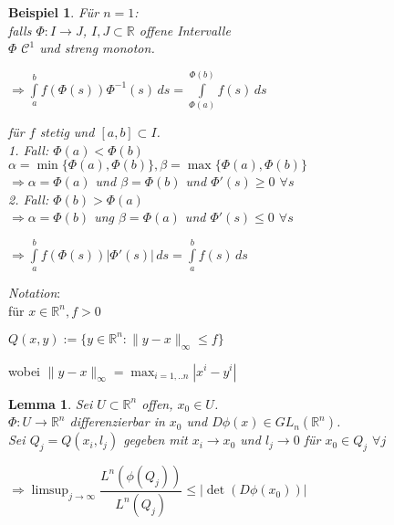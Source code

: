 \documentclass[11pt]{memoir}
\theoremstyle{changebreak}
\newtheorem{Beispiel}{Beispiel}[chapter]
\newtheorem{Lemma}{Lemma}[chapter]
\begin{document}
\begin{Beispiel}
Für $n = 1$: \\
falls $\Phi: I \rightarrow J$, $I, J \subset \mathbb R$ offene Intervalle \\
$\Phi$ $\mathscr C^1$ und streng monoton. \\
\begin{center}
	$\Rightarrow \int\limits_a^b f\left(\Phi(s)\right) \Phi^{-1}(s) \, ds = \int\limits_{\Phi(a)}^{\Phi(b)} f(s) \, ds$
\end{center}
für $f$ stetig und $[a, b] \subset I$. \\

\emph{1. Fall}: $\Phi(a) < \Phi(b)$ \\
$\alpha = \min{\{\Phi(a), \Phi(b)\}}, \beta = \max{\{\Phi(a), \Phi(b)\}} $ \\
$\Rightarrow \alpha = \Phi(a)$ und $\beta = \Phi(b)$ und $\Phi'(s) \geq 0$ $\forall s$ \\

\emph{2. Fall}: $\Phi(b) > \Phi(a)$ \\
$\Rightarrow \alpha= \Phi(b)$ ung $\beta = \Phi(a)$ und $\Phi'(s) \leq 0$ $\forall s$
\begin{center}
	$\Rightarrow \int\limits_a^b f(\Phi(s))|\Phi'(s)|\, ds = \int\limits_a^b f(s)\, ds$
\end{center}
\end{Beispiel}

\emph{Notation}: \\
für $x \in \mathbb R^n, f > 0$ \\
\begin{center}
	$Q(x, y) := \{y \in \mathbb R^n: \|y-x\|_\infty \leq f\}$
\end{center}
wobei $\|y-x\|_\infty = \max_{i = 1, .. n} |x^{i} - y^{i}|$


\begin{Lemma}
Sei $U \subset \mathbb R^n$ offen, $x_0 \in U$. \\
$\Phi: U \rightarrow \mathbb R^n$ differenzierbar in $x_0$ und $D\phi(x) \in GL_n(\mathbb R^n)$. \\
Sei $Q_j = Q(x_i, l_j)$ gegeben mit $x_i \rightarrow x_0$ und $l_j \rightarrow 0$ für $x_0 \in Q_j$ $\forall j$
\begin{center}
	$\Rightarrow  \limsup_{j \rightarrow \infty} \dfrac{L^n(\phi(Q_j))}{L^n(Q_j)} \leq \left| \det (D\phi(x_0))\right|$
\end{center}
\end{Lemma}
\end{document}

